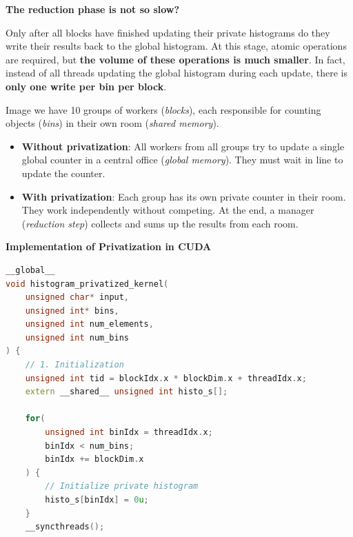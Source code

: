 \begin{itemize}
    \begin{flushleft}
        \textcolor{Green3}{ \textbf{The reduction phase is not so slow?}}
    \end{flushleft}
    Only after all blocks have fini\textbf{}shed updating their private histograms do they write their results back to the global histogram. At this stage, atomic operations are required, but \textbf{the volume of these operations is much smaller}. In fact, instead of all threads updating the global histogram during each update, there is \textbf{only one write per bin per block}.

    \begin{examplebox}
        Image we have 10 groups of workers (\emph{blocks}), each responsible for counting objects (\emph{bins}) in their own room (\emph{shared memory}).
        \begin{itemize}
            \item[\textcolor{Red2}{\faIcon{times}}] \textbf{Without privatization}: All workers from all groups try to update a single global counter in a central office (\emph{global memory}). They must wait in line to update the counter.
            \item[\textcolor{Green3}{\faIcon{check}}] \textbf{With privatization}: Each group has its own private counter in their room. They work independently without competing. At the end, a manager (\emph{reduction step}) collects and sums up the results from each room.
        \end{itemize}
    \end{examplebox}

    \newpage

    \begin{flushleft}
        \textcolor{Green3}{ \textbf{Implementation of Privatization in CUDA}}
    \end{flushleft}
        \begin{lstlisting}[language=c++]
__global__
void histogram_privatized_kernel(
    unsigned char* input,
    unsigned int* bins,
    unsigned int num_elements,
    unsigned int num_bins
) {
    // 1. Initialization
    unsigned int tid = blockIdx.x * blockDim.x + threadIdx.x;
    extern __shared__ unsigned int histo_s[];

    for(
        unsigned int binIdx = threadIdx.x;
        binIdx < num_bins;
        binIdx += blockDim.x
    ) {
        // Initialize private histogram
        histo_s[binIdx] = 0u;
    }    
    __syncthreads();



\end{lstlisting}
\end{itemize}
